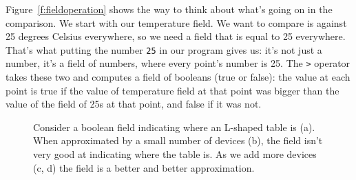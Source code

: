 \documentclass{article}
\newcommand\var[1]{{\tt #1}}
\begin{document}
Figure~\ref{f:fieldoperation} shows the way to think about what's
going on in the comparison.  We start with our temperature field.  We
want to compare is against 25 degrees Celsius everywhere, so we need a
field that is equal to 25 everywhere.  That's what putting the number
\var{25} in our program gives us: it's not just a number, it's a field
of numbers, where every point's number is 25.  The \var{>} operator
takes these two and computes a field of booleans (true or false): the
value at each point is true if the value of temperature field at that
point was bigger than the value of the field of 25s at that point, and
false if it was not.

\begin{figure}[ht]
\centering
{}
\caption{Consider a boolean field indicating where an L-shaped table is (a).
  When approximated by a small number of devices (b), the field isn't very
  good at indicating where the table is.  As we add more devices (c, d)
  the field is a better and better approximation.}
\label{f:quantization}
\end{figure}
\end{document}
